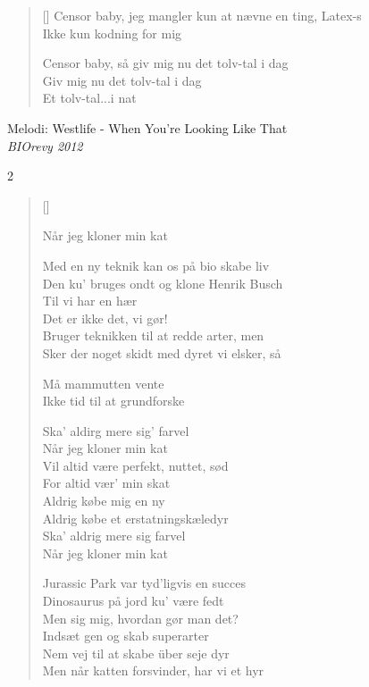 {\begin{multicols}
\begin{verse}[\versewidth]
Censor baby, jeg mangler kun at nævne en ting, Latex-s\\
Ikke kun kodning for mig

Censor baby, så giv mig nu det tolv-tal i dag\\
Giv mig nu det tolv-tal i dag\\
Et tolv-tal...i nat
\end{verse}
\end{multicols}


\newpage



{Melodi: Westlife - When You're Looking Like That}\\[.2em]
{\small\itshape BIOrevy 2012}
\begin{multicols}2
\settowidth{\versewidth}{Sker der noget skidt med dyret vi elsker, så}
\begin{verse}[\versewidth]

Når jeg kloner min kat

Med en ny teknik kan os på bio skabe liv\\
Den ku' bruges ondt og klone Henrik Busch\\
Til vi har en hær\\
Det er ikke det, vi gør!\\
Bruger teknikken til at redde arter, men\\
Sker der noget skidt med dyret vi elsker, så

Må mammutten vente\\
Ikke tid til at grundforske

Ska' aldirg mere sig' farvel\\
Når jeg kloner min kat\\
Vil altid være perfekt, nuttet, sød\\
For altid vær' min skat\\
Aldrig købe mig en ny\\
Aldrig købe et erstatningskæledyr\\
Ska' aldrig mere sig farvel\\
Når jeg kloner min kat

Jurassic Park var tyd'ligvis en succes\\
Dinosaurus på jord ku' være fedt\\
Men sig mig, hvordan gør man det?\\
Indsæt gen og skab superarter\\
Nem vej til at skabe über seje dyr\\
Men når katten forsvinder, har vi et hyr


\end{verse}
\end{multicols}}
